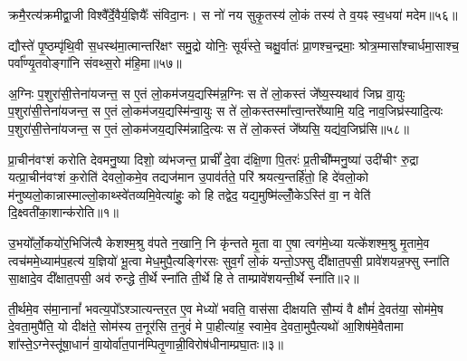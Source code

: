 क्रमै॒रत्य॑क्रमीद्वा॒जी विश्वै᳚र्दे॒वैर्य॒ज्ञियैः᳚ संविदा॒नः। स नो॑ नय सुकृ॒तस्य॑ लो॒कं तस्य॑ ते व॒यꣴ स्व॒धया॑ मदेम॥५६॥

{\anuvakamend[{क्रमै॑र॒ष्टाद॑श॥24॥}]}

द्यौस्ते॑ पृ॒ष्ठम्पृ॑थि॒वी स॒धस्थ॑मा॒त्मान्तरि॑क्षꣳ समु॒द्रो योनिः॒ सूर्य॑स्ते॒ चक्षु॒र्वातः॑ प्रा॒णश्च॒न्द्रमाः॒ श्रोत्र॒म्मासा᳚श्चार्धमा॒साश्च॒ पर्वा᳚ण्यृ॒तवोङ्गा॑नि संवथ्स॒रो म॑हि॒मा॥५७॥

{\anuvakamend[{द्यौः पञ्च॑विꣳशतिः॥25॥}]}

अ॒ग्निः प॒शुरा॑सी॒त्तेना॑यजन्त॒ स ए॒तं लो॒कम॑जय॒द्यस्मि॑न्न॒ग्निः स ते॑ लो॒कस्तं जे᳚ष्य॒स्यथाव॑ जिघ्र वा॒युः प॒शुरा॑सी॒त्तेना॑यजन्त॒ स ए॒तं लो॒कम॑जय॒द्यस्मि॑न्वा॒युः स ते॑ लो॒कस्तस्मा᳚त्त्वा॒न्तरे᳚ष्यामि॒ यदि॒ नाव॒जिघ्र॑स्यादि॒त्यः प॒शुरा॑सी॒त्तेना॑यजन्त॒ स ए॒तं लो॒कम॑जय॒द्यस्मि॑न्नादि॒त्यः स ते॑ लो॒कस्तं जे᳚ष्यसि॒ यद्य॑व॒जिघ्र॑सि॥५८॥

{\anuvakamend[{यस्मि॑न्न॒ष्टौ च॑॥26॥}]}


{}

\setcounter{anuvakam}{0}
प्रा॒चीन॑वꣳशं करोति देवमनु॒ष्या दिशो॒ व्य॑भजन्त॒ प्राचीं᳚ दे॒वा द॑क्षि॒णा पि॒तरः॑ प्र॒तीची᳚म्मनु॒ष्या॑ उदी॑चीꣳ रु॒द्रा यत्प्रा॒चीन॑वꣳशं क॒रोति॑ देवलो॒कमे॒व तद्यज॑मान उ॒पाव॑र्तते॒ परि॑ श्रयत्य॒न्तर्\mbox{}हि॑तो॒ हि दे॑वलो॒को म॑नुष्यलो॒का\-न्नास्माल्लो॒काथ्स्वे॑तव्यमि॒वेत्या॑हुः॒ को हि तद्वेद॒ यद्य॒मुष्मि॑ल्लोँ॒के\-ऽस्ति॑ वा॒ न वेति॑ दि॒क्ष्वती॑का॒शान्क॑रोति॥१॥

उ॒भयो᳚र्लो॒कयो॑र॒भिजि॑त्यै केशश्म॒श्रु व॑पते न॒खानि॒ नि कृ॑न्तते मृ॒ता वा ए॒षा त्वग॑मे॒ध्या यत्के॑शश्म॒श्रु मृ॒तामे॒व त्वच॑ममे॒ध्याम॑प॒हत्य॑ य॒ज्ञियो॑ भू॒त्वा मेध॒मुपै॒त्यङ्गि॑रसः सुव॒र्गं लो॒कं यन्तो॒\-ऽफ्सु दी᳚क्षात॒पसी॒ प्रावे॑शयन्न॒फ्सु स्ना॑ति सा॒क्षादे॒व दी᳚क्षात॒पसी॒ अव॑ रुन्द्धे ती॒र्थे स्ना॑ति ती॒र्थे हि ते ताम्प्रावे॑शयन्ती॒र्थे स्ना॑ति॥२॥

ती॒र्थमे॒व स॑मा॒नानां᳚ भवत्य॒पो᳚\-ऽश्ञात्यन्तर॒त ए॒व मेध्यो॑ भवति॒ वास॑सा दीक्षयति सौ॒म्यं वै क्षौमं॑ दे॒वत॑या॒ सोम॑मे॒ष दे॒वता॒मुपै॑ति॒ यो दीक्ष॑ते॒ सोम॑स्य त॒नूर॑सि त॒नुवं॑ मे पा॒हीत्या॑ह॒ स्वामे॒व दे॒वता॒मुपै॒त्यथो॑ आ॒शिष॑मे॒वैतामा शा᳚स्ते॒\-ऽग्नेस्तू॑षा॒धानं॑ वा॒योर्वा॑त॒पान॑म्पितृ॒णान्नी॒विरोष॑धीनाम्प्रघा॒तः॥३॥

